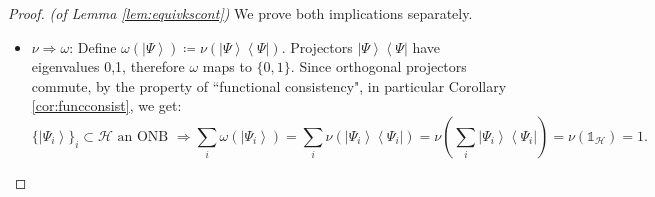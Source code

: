 \begin{proof}\emph{(of Lemma \ref{lem:equivkscont})} We prove both implications separately.\begin{itemize}
\item $\nu\Rightarrow\omega$\thinspace: Define $\omega(\left|\Psi\right\rangle )\coloneqq\nu(\left|\Psi\right\rangle \left\langle \Psi\right|)$. Projectors $\left|\Psi\right\rangle \left\langle \Psi\right|$ have eigenvalues {0,1}, therefore $\omega$ maps to $\{0,1\}$. Since orthogonal projectors commute, by the property of ``functional consistency", in particular Corollary \ref{cor:funcconsist}, we get:
\begin{equation*}
    \{\left|\Psi_{i}\right\rangle \}_{i}\subset\mathcal{H} \text{ an ONB } \Rightarrow\sum_{i}\omega(\left|\Psi_{i}\right\rangle )=\sum_{i}\nu(\left|\Psi_{i}\right\rangle \left\langle \Psi_{i}\right|)=\nu(\sum_{i}\left|\Psi_{i}\right\rangle \left\langle \Psi_{i}\right|)=\nu(\mathbb{1}_{\mathcal{H}})=1.\end{equation*}


\end{itemize}
\end{proof}
